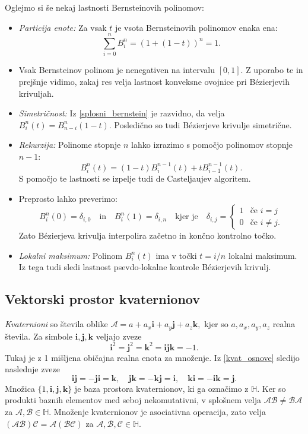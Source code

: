 \documentclass[12pt,a4paper,twoside]{article}
\theoremstyle{definition} %
\theoremstyle{plain} %
\theoremstyle{primerstyle}
\numberwithin{equation}{section}  %
\newcommand{\quat}{\mathbb H}
\newcommand{\iV}{\mathbf{i}}
\newcommand{\jV}{\mathbf{j}}
\newcommand{\kV}{\mathbf{k}}
\newcommand{\AQ}{\mathcal{A}}
\newcommand{\BQ}{\mathcal{B}}
\newcommand{\CQ}{\mathcal{C}}
\begin{document}
Oglejmo si še nekaj lastnosti Bernsteinovih polinomov:
\begin{itemize}
	\item \emph{Particija enote:} Za vsak $t$ je vsota Bernsteinovih polinomov enaka ena:
	$$\sum_{i=0}^nB_i^n=(1+(1-t))^n=1.$$
	\item Vsak Bernsteinov polinom je nenegativen na intervalu $[0,1].$ Z uporabo te in prejšnje vidimo, zakaj res velja lastnost konveksne ovojnice pri Bézierjevih krivuljah.
	\item \emph{Simetričnost:} Iz \eqref{splosni_bernstein} je razvidno, da velja $B_i^n(t)=B_{n-i}^n(1-t).$ Posledično so tudi Bézierjeve krivulje simetrične.
	\item \emph{Rekurzija:} Polinome stopnje $n$ lahko izrazimo s pomočjo polinomov stopnje $n-1:$
	$$B_i^n(t)=(1-t)B_i^{n-1}(t)+tB_{i-1}^{n-1}(t).$$
	S pomočjo te lastnosti se izpelje tudi de Casteljaujev algoritem.
	\item Preprosto lahko preverimo:
	$$B_i^n(0)=\delta_{i,0}\quad\text{in}\quad B_i^n(1)=\delta_{i,n}\quad\text{kjer je}\quad \delta_{i,j}=\begin{cases}
										   		1 & \text{če } i=j\\
										   		0 & \text{če } i\neq j.
										   \end{cases}$$
	Zato Bézierjeva krivulja interpolira začetno in končno kontrolno točko.
	\item \emph{Lokalni maksimum:} Polinom $B_i^n(t)$ ima v točki $t=i/n$ lokalni maksimum. Iz tega tudi sledi lastnost psevdo-lokalne kontrole Bézierjevih krivulj.
\end{itemize}

\subsection{Vektorski prostor kvaternionov}
\label{kvaternioni_poglavje}

\emph{Kvaternioni} so števila oblike $\AQ=a+a_x\iV+a_y\jV+a_z\kV,$ kjer so $a,a_x,a_y,a_z$ realna števila. Za simbole $\iV,\jV,\kV$ veljajo zveze
\begin{equation}
	\label{kvat_osnove}
	\iV^2=\jV^2=\kV^2=\iV\jV\kV=-1.
\end{equation}
Tukaj je z 1 mišljena običajna realna enota za množenje. Iz \eqref{kvat_osnove} sledijo naslednje zveze
\begin{equation}
	\label{kvat_osnove2}
	\iV\jV=-\jV\iV=\kV,\quad\jV\kV=-\kV\jV=\iV,\quad\kV\iV=-\iV\kV=\jV.
\end{equation}
Množica $\{1,\iV,\jV,\kV\}$ je baza prostora kvaternionov, ki ga označimo z $\quat.$ Ker so produkti baznih elementov med seboj nekomutativni, v splošnem velja $\AQ\BQ\neq\BQ\AQ$ za $\AQ,\BQ\in\quat.$ Množenje kvaternionov je asociativna operacija, zato velja $(\AQ\BQ)\CQ=\AQ(\BQ\CQ)$ za $\AQ,\BQ,\CQ\in\quat.$
\end{document}
